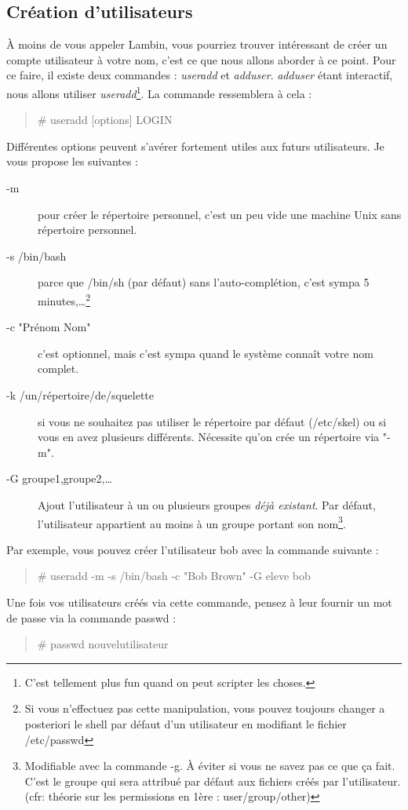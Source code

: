 \documentclass[a4paper,11pt]{article}
\newcommand{\commande}[1] {
    \begin{quote}
    \tt\raggedright #1
    \end{quote}
}
\begin{document}
\subsection{Création d'utilisateurs}
\par À moins de vous appeler Lambin, vous pourriez trouver intéressant de créer un compte utilisateur à votre nom, c'est ce que nous allons aborder à ce point. Pour ce faire, il existe deux commandes : \emph{useradd} et \emph{adduser}. \emph{adduser} étant interactif, nous allons utiliser \emph{useradd}\footnote{C'est tellement plus fun quand on peut scripter les choses.}. La commande ressemblera à cela :
\commande{\# useradd [options] LOGIN}
\par Différentes options peuvent s'avérer fortement utiles aux futurs utilisateurs. Je vous propose les suivantes :
\begin{description}
    \item[-m] pour créer le répertoire personnel, c'est un peu vide une machine Unix sans répertoire personnel.
    \item[-s /bin/bash] parce que /bin/sh (par défaut) sans l'auto-complétion, c'est sympa 5 minutes,\ldots\footnote{Si vous n'effectuez pas cette manipulation, vous pouvez toujours changer a posteriori le shell par défaut d'un utilisateur en modifiant le fichier /etc/passwd}
    \item[-c "Prénom Nom"] c'est optionnel, mais c'est sympa quand le système connaît votre nom complet.
    \item [-k /un/répertoire/de/squelette] si vous ne souhaitez pas utiliser le répertoire par défaut (/etc/skel) ou si vous en avez plusieurs différents. Nécessite qu'on crée un répertoire via "-m".
    \item[-G groupe1,groupe2,\dots] Ajout l'utilisateur à un ou plusieurs groupes \emph{déjà existant}. Par défaut, l'utilisateur appartient au moins à un groupe portant son nom\footnote{Modifiable avec la commande -g. À éviter si vous ne savez pas ce que ça fait. C'est le groupe qui sera attribué par défaut aux fichiers créés par l'utilisateur. (cfr: théorie sur les permissions en 1ère : user/group/other)}.
\end{description}
\par Par exemple, vous pouvez créer l'utilisateur bob avec la commande suivante :
\commande{\# useradd -m -s /bin/bash -c "Bob Brown" -G eleve bob}
\par Une fois vos utilisateurs créés via cette commande, pensez à leur fournir un mot de passe via la commande passwd :
\commande{\# passwd nouvelutilisateur}
\end{document}
